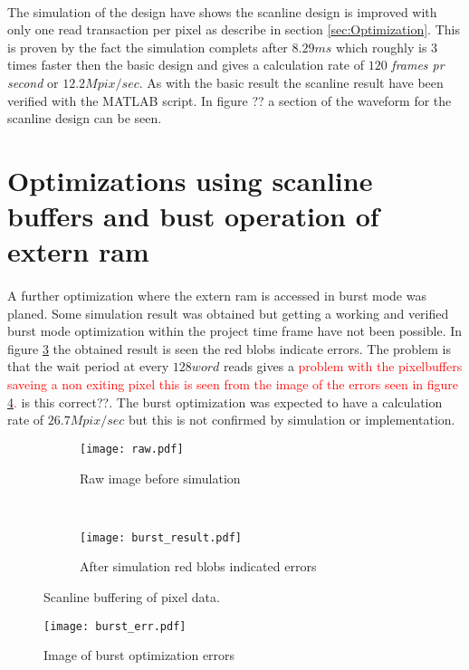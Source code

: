 \paragraph*{}
The simulation of the design have shows the scanline design is improved with only one read transaction per pixel as describe in section \ref{sec:Optimization}. This is proven by the fact the simulation complets after $8.29ms$ which roughly is 3 times faster then the basic design and gives a calculation rate of $120$ \textit{frames pr second} or $12.2Mpix/sec$. As with the basic result the scanline result have been verified with the MATLAB script. In figure ?? a section of the waveform  for the scanline design can be seen.

\section{Optimizations using scanline buffers and bust operation of extern ram}
\paragraph*{}
A further optimization where the extern ram is accessed in burst mode was planed. Some simulation result was obtained but getting a working and verified burst mode optimization within the project time frame have not been possible. In figure \ref{fig:burst_picture} the obtained result is seen the red blobs indicate errors. The problem is that the wait period at every $128word$ reads gives a \textcolor{red}{problem with the pixelbuffers saveing a non exiting pixel this is seen from the image of the errors seen in figure \ref{fig:pic_burst_err}.} is this correct??. The burst optimization was expected to have a calculation rate of $26.7Mpix/sec$ but this is not confirmed by simulation or implementation.
     
\begin{figure}[H]
	\centering
	\begin{subfigure}[b]{0.5\textwidth}
		\texttt{[image: raw.pdf]}
		\caption{Raw image before simulation}
		\label{fig:raw_burst}
    \end{subfigure}%
        ~ %
    \begin{subfigure}[b]{0.5\textwidth}
    	\texttt{[image: burst\_result.pdf]}
    	\caption{After simulation red blobs indicated errors}
    	\label{fig:burst_picture_sobel}
	\end{subfigure}
	\caption{Scanline buffering of pixel data.}
    	\label{fig:burst_picture}
\end{figure}


\begin{figure}[H]
	\centering
	\texttt{[image: burst\_err.pdf]}
	\caption{Image of burst optimization errors}
	\label{fig:pic_burst_err}
\end{figure}